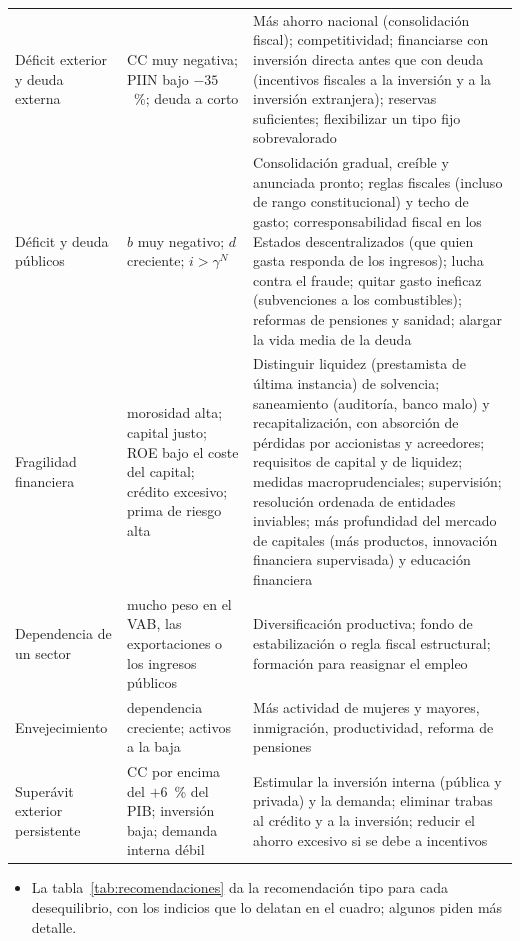 \documentclass[11pt]{article}
\begin{document}
\begin{table}[!t]
\begin{tabular}{>{\raggedright\arraybackslash}p{2.7cm}>{\raggedright\arraybackslash}p{3.8cm}>{\raggedright\arraybackslash}p{7.8cm}}
Déficit exterior y deuda externa & CC muy negativa; PIIN bajo $-35$~\%; deuda a corto & Más ahorro nacional (consolidación fiscal); competitividad; financiarse con inversión directa antes que con deuda (incentivos fiscales a la inversión y a la inversión extranjera); reservas suficientes; flexibilizar un tipo fijo sobrevalorado \\
Déficit y deuda públicos & $b$ muy negativo; $d$ creciente; $i>\gamma^N$ & Consolidación gradual, creíble y anunciada pronto; reglas fiscales (incluso de rango constitucional) y techo de gasto; corresponsabilidad fiscal en los Estados descentralizados (que quien gasta responda de los ingresos); lucha contra el fraude; quitar gasto ineficaz (subvenciones a los combustibles); reformas de pensiones y sanidad; alargar la vida media de la deuda \\
Fragilidad financiera & morosidad alta; capital justo; ROE bajo el coste del capital; crédito excesivo; prima de riesgo alta & Distinguir liquidez (prestamista de última instancia) de solvencia; saneamiento (auditoría, banco malo) y recapitalización, con absorción de pérdidas por accionistas y acreedores; requisitos de capital y de liquidez; medidas macroprudenciales; supervisión; resolución ordenada de entidades inviables; más profundidad del mercado de capitales (más productos, innovación financiera supervisada) y educación financiera \\
Dependencia de un sector & mucho peso en el VAB, las exportaciones o los ingresos públicos & Diversificación productiva; fondo de estabilización o regla fiscal estructural; formación para reasignar el empleo \\
Envejecimiento & dependencia creciente; activos a la baja & Más actividad de mujeres y mayores, inmigración, productividad, reforma de pensiones \\
Superávit exterior persistente & CC por encima del $+6$~\% del PIB; inversión baja; demanda interna débil & Estimular la inversión interna (pública y privada) y la demanda; eliminar trabas al crédito y a la inversión; reducir el ahorro excesivo si se debe a incentivos \\
\bottomrule
\end{tabular}
\end{table}

\begin{itemize}
\item La tabla~\ref{tab:recomendaciones} da la recomendación tipo para cada desequilibrio, con los indicios que lo delatan en el cuadro; algunos piden más detalle.
\end{itemize}
\end{document}
